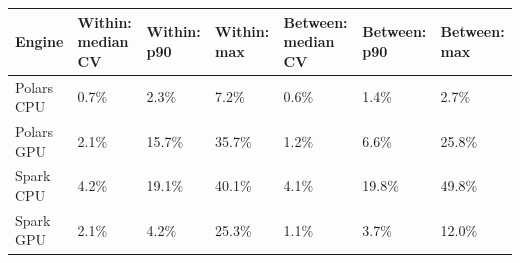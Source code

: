 \begin{tabular}{lllllll}
\toprule
Engine & Within: median CV & Within: p90 & Within: max & Between: median CV & Between: p90 & Between: max \\
\midrule
Polars CPU & 0.7\% & 2.3\% & 7.2\% & 0.6\% & 1.4\% & 2.7\% \\
Polars GPU & 2.1\% & 15.7\% & 35.7\% & 1.2\% & 6.6\% & 25.8\% \\
Spark CPU & 4.2\% & 19.1\% & 40.1\% & 4.1\% & 19.8\% & 49.8\% \\
Spark GPU & 2.1\% & 4.2\% & 25.3\% & 1.1\% & 3.7\% & 12.0\% \\
\bottomrule
\end{tabular}
